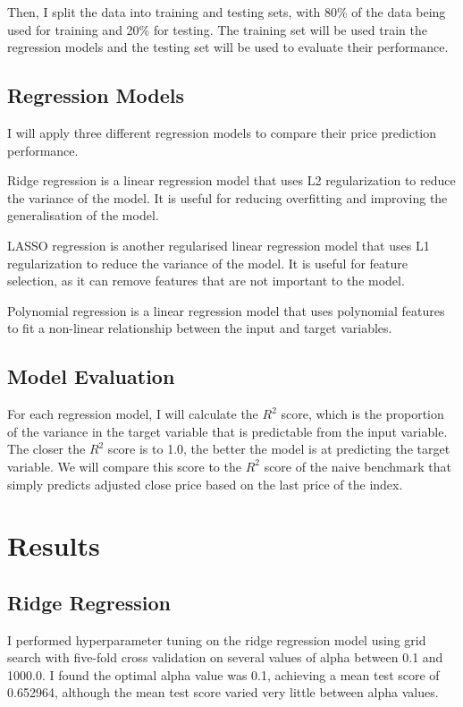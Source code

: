 \documentclass[a4paper, 11pt]{article}
\begin{document}
Then, I split the data into training and testing sets, with 80\% of the data being used for training and 20\% for testing. The training set will be used train the regression models and the testing set will be used to evaluate their performance.

\subsection{Regression Models}
I will apply three different regression models to compare their price prediction performance.

Ridge regression is a linear regression model that uses L2 regularization to reduce the variance of the model. It is useful for reducing overfitting and improving the generalisation of the model.

LASSO regression is another regularised linear regression model that uses L1 regularization to reduce the variance of the model. It is useful for feature selection, as it can remove features that are not important to the model.

Polynomial regression is a linear regression model that uses polynomial features to fit a non-linear relationship between the input and target variables.

\subsection{Model Evaluation}
For each regression model, I will calculate the $R^2$ score, which is the proportion of the variance in the target variable that is predictable from the input variable. The closer the $R^2$ score is to 1.0, the better the model is at predicting the target variable. We will compare this score to the $R^2$ score of the naive benchmark that simply predicts adjusted close price based on the last price of the index.

\section{Results}
\subsection{Ridge Regression}
I performed hyperparameter tuning on the ridge regression model using grid search with five-fold cross validation on several values of alpha between 0.1 and 1000.0. I found the optimal alpha value was 0.1, achieving a mean test score of 0.652964, although the mean test score varied very little between alpha values.
\end{document}
